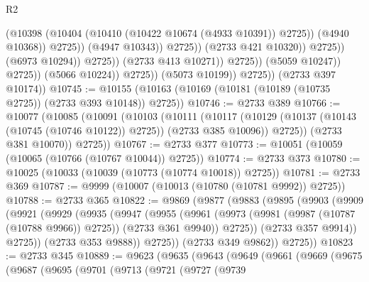 \begin{lexlean}{R2}
\begin{coremodule}
                                                    (@10398
                                                      (@10404
                                                        (@10410
                                                          (@10422 @10674 (@4933 @10391))
                                                          @2725))
                                                      (@4940 @10368))
                                                    @2725))
                                                (@4947 @10343))
                                              @2725))
                                          (@2733 @421 @10320))
                                        @2725))
                                    (@6973 @10294))
                                  @2725))
                              (@2733 @413 @10271))
                            @2725))
                        (@5059 @10247))
                      @2725))
                  (@5066 @10224))
                @2725))
            (@5073 @10199))
          @2725))
      (@2733 @397 @10174))
@10745 := @10155 (@10163 (@10169 (@10181 (@10189 (@10735 @2725)) (@2733 @393 @10148)) @2725))
@10746 := @2733 @389
@10766 := @10077
    (@10085
      (@10091
        (@10103
          (@10111
            (@10117
              (@10129 (@10137 (@10143 (@10745 (@10746 @10122)) @2725)) (@2733 @385 @10096))
              @2725))
          (@2733 @381 @10070))
        @2725))
@10767 := @2733 @377
@10773 := @10051 (@10059 (@10065 (@10766 (@10767 @10044)) @2725))
@10774 := @2733 @373
@10780 := @10025 (@10033 (@10039 (@10773 (@10774 @10018)) @2725))
@10781 := @2733 @369
@10787 := @9999 (@10007 (@10013 (@10780 (@10781 @9992)) @2725))
@10788 := @2733 @365
@10822 := @9869
    (@9877
      (@9883
        (@9895
          (@9903
            (@9909
              (@9921
                (@9929
                  (@9935
                    (@9947
                      (@9955
                        (@9961
                          (@9973 (@9981 (@9987 (@10787 (@10788 @9966)) @2725)) (@2733 @361 @9940))
                          @2725))
                      (@2733 @357 @9914))
                    @2725))
                (@2733 @353 @9888))
              @2725))
          (@2733 @349 @9862))
        @2725))
@10823 := @2733 @345
@10889 := @9623
    (@9635
      (@9643
        (@9649
          (@9661
            (@9669
              (@9675
                (@9687
                  (@9695
                    (@9701
                      (@9713
                        (@9721
                          (@9727
                            (@9739

\end{coremodule}
\end{lexlean}
